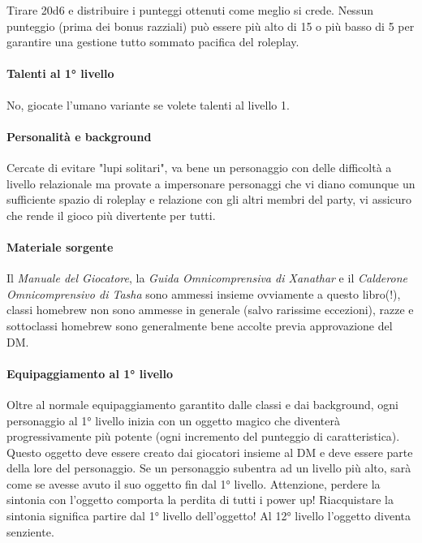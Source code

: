 Tirare 20d6 e distribuire i punteggi ottenuti come meglio si crede. Nessun punteggio (prima dei bonus razziali) può essere più alto di 15 o più basso di 5 per garantire una gestione tutto sommato pacifica del roleplay.

\paragraph{Talenti al 1° livello}

No, giocate l'umano variante se volete talenti al livello 1.

\paragraph{Personalità e background}

Cercate di evitare "lupi solitari", va bene un personaggio con delle difficoltà a livello relazionale ma provate a impersonare personaggi che vi diano comunque un sufficiente spazio di roleplay e relazione con gli altri membri del party, vi assicuro che rende il gioco più divertente per tutti.

\paragraph{Materiale sorgente}

Il \textit{Manuale del Giocatore}, la \textit{Guida Omnicomprensiva di Xanathar} e il \textit{Calderone Omnicomprensivo di Tasha} sono ammessi insieme ovviamente a questo libro(!), classi homebrew non sono ammesse in generale (salvo rarissime eccezioni), razze e sottoclassi homebrew sono generalmente bene accolte previa approvazione del DM. 

\paragraph{Equipaggiamento al 1° livello}

Oltre al normale equipaggiamento garantito dalle classi e dai background, ogni personaggio al 1° livello inizia con un oggetto magico che diventerà progressivamente più potente (ogni incremento del punteggio di caratteristica). Questo oggetto deve essere creato dai giocatori insieme al DM e deve essere parte della lore del personaggio. Se un personaggio subentra ad un livello più alto, sarà come se avesse avuto il suo oggetto fin dal 1° livello. Attenzione, perdere la sintonia con l'oggetto comporta la perdita di tutti i power up! Riacquistare la sintonia significa partire dal 1° livello dell'oggetto! Al 12° livello l'oggetto diventa senziente.

